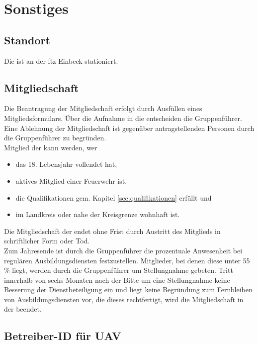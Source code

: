 \section{Sonstiges}

\subsection{Standort}

Die \callee{} ist an der \ac{ftz} Einbeck stationiert.

\subsection{Mitgliedschaft}
\label{sec:membership}

Die Beantragung der Mitgliedschaft erfolgt durch Ausfüllen eines Mitgliedsformulars. Über die Aufnahme in die \callee{} entscheiden die Gruppenführer. Eine Ablehnung der Mitgliedschaft ist gegenüber antragstellenden Personen durch die Gruppenführer zu begründen.\\

\noindent Mitglied der \callee{} kann werden, wer

\begin{itemize}
\item das 18. Lebensjahr vollendet hat,
\item aktives Mitglied einer Feuerwehr ist,
\item die Qualifikationen gem. Kapitel \ref{sec:qualifikationen} erfüllt und
\item im Landkreis \district{} oder nahe der Kreisgrenze wohnhaft ist.
\end{itemize}

\noindent Die Mitgliedschaft der \callee{} endet ohne Frist durch Austritt des Mitglieds in schriftlicher Form oder Tod.\\

\noindent Zum Jahresende ist durch die Gruppenführer die prozentuale Anwesenheit bei regulären Ausbildungsdiensten festzustellen. Mitglieder, bei denen diese unter 55\,\% liegt, werden durch die Gruppenführer um Stellungnahme gebeten. Tritt innerhalb von sechs Monaten nach der Bitte um eine Stellungnahme keine Besserung der Dienstbeteiligung ein und liegt keine Begründung zum Fernbleiben von Ausbildungsdiensten vor, die dieses rechtfertigt, wird die Mitgliedschaft in der \callee{} beendet.

\subsection{Betreiber-ID für UAV}

